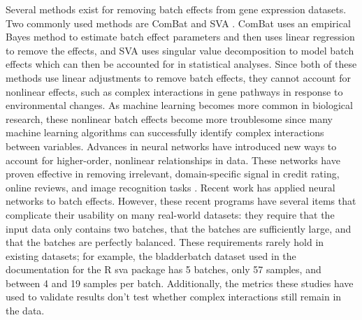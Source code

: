 \documentclass[notitlepage]{article}
\begin{document}
Several methods exist for removing batch effects from gene expression datasets.
Two commonly used methods are ComBat \citep{johnson_adjusting_2007} and SVA \citep{leek_capturing_2007}.
ComBat uses an empirical Bayes method to estimate batch effect parameters and then uses linear regression to remove the effects, and SVA uses singular value decomposition to model batch effects which can then be accounted for in statistical analyses.
Since both of these methods use linear adjustments to remove batch effects, they cannot account for nonlinear effects, such as complex interactions in gene pathways in response to environmental changes.
As machine learning becomes more common in biological research, these nonlinear batch effects become more troublesome since many machine learning algorithms can successfully identify complex interactions between variables.
Advances in neural networks have introduced new ways to account for higher-order, nonlinear relationships in data.
These networks have proven effective in removing irrelevant, domain-specific signal in credit rating, online reviews, and image recognition tasks \citep{louizos_variational_2015}.
Recent work \cite{shaham_removal_2017,shaham_batch_2018,upadhyay_removal_2019} has applied neural networks to batch effects.
However, these recent programs have several items that complicate their usability on many real-world datasets:
they require that the input data only contains two batches, that the batches are sufficiently large, and that the batches are perfectly balanced.
These requirements rarely hold in existing datasets; for example, the bladderbatch dataset used in the documentation for the R sva package \cite{leek_bladderbatch_2017,leek_sva_2017} has 5 batches, only 57 samples, and between 4 and 19 samples per batch.
Additionally, the metrics these studies have used to validate results don't test whether complex interactions still remain in the data.
\end{document}
